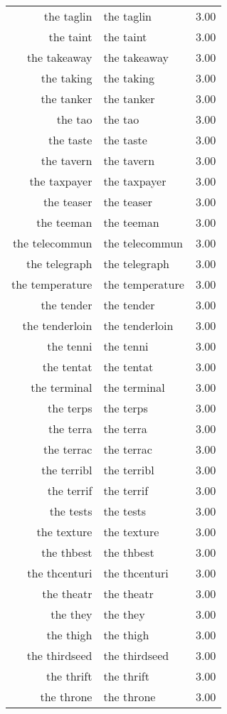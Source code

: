 \begin{table}[ht]
\begin{tabular}{rlr}
  the taglin & the taglin & 3.00 \\ 
  the taint & the taint & 3.00 \\ 
  the takeaway & the takeaway & 3.00 \\ 
  the taking & the taking & 3.00 \\ 
  the tanker & the tanker & 3.00 \\ 
  the tao & the tao & 3.00 \\ 
  the taste & the taste & 3.00 \\ 
  the tavern & the tavern & 3.00 \\ 
  the taxpayer & the taxpayer & 3.00 \\ 
  the teaser & the teaser & 3.00 \\ 
  the teeman & the teeman & 3.00 \\ 
  the telecommun & the telecommun & 3.00 \\ 
  the telegraph & the telegraph & 3.00 \\ 
  the temperature & the temperature & 3.00 \\ 
  the tender & the tender & 3.00 \\ 
  the tenderloin & the tenderloin & 3.00 \\ 
  the tenni & the tenni & 3.00 \\ 
  the tentat & the tentat & 3.00 \\ 
  the terminal & the terminal & 3.00 \\ 
  the terps & the terps & 3.00 \\ 
  the terra & the terra & 3.00 \\ 
  the terrac & the terrac & 3.00 \\ 
  the terribl & the terribl & 3.00 \\ 
  the terrif & the terrif & 3.00 \\ 
  the tests & the tests & 3.00 \\ 
  the texture & the texture & 3.00 \\ 
  the thbest & the thbest & 3.00 \\ 
  the thcenturi & the thcenturi & 3.00 \\ 
  the theatr & the theatr & 3.00 \\ 
  the they & the they & 3.00 \\ 
  the thigh & the thigh & 3.00 \\ 
  the thirdseed & the thirdseed & 3.00 \\ 
  the thrift & the thrift & 3.00 \\ 
  the throne & the throne & 3.00 \\ 

\end{tabular}
\end{table}
